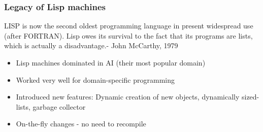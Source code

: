 \documentclass{beamer}
\begin{document}
\begin{frame}
	\frametitle{Legacy of Lisp machines}
		\begin{block}{ }
		LISP is now the second oldest programming language in present widespread use (after FORTRAN). Lisp owes its survival to the fact that its programs are lists, which is actually a disadvantage.\newline\newline-
		John McCarthy, 1979
		\end{block}
		
			\begin{itemize}
				\item Lisp machines dominated in AI (their most popular domain)
				\item Worked very well for domain-specific programming
				\item Introduced new features: Dynamic creation of new objects, dynamically sized-lists, garbage collector
				\item On-the-fly changes - no need to recompile\newline
			\end{itemize}
	
\end{frame}
\end{document}
